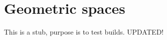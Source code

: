 \documentclass[../main.tex]{subfiles}
\begin{document}
\setcounter{chapter}{2}
\setcounter{section}{3}

\section{Geometric spaces}

This is a stub, purpose is to test builds. UPDATED!
\end{document}
